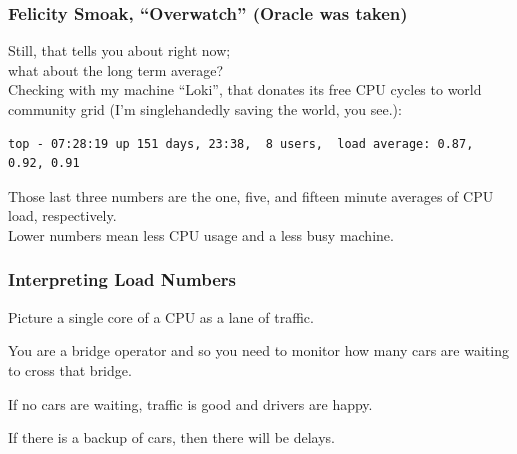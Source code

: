 \begin{frame}[fragile]
\frametitle{Felicity Smoak, ``Overwatch'' (Oracle was taken)}

\large
\begin{changemargin}{1cm}
Still, that tells you about right now; \\
what about the long term average? \\[1em]

Checking with my machine ``Loki'', that donates its free CPU cycles to world community grid (I'm singlehandedly saving the world, you see.):\\[1em]

{\scriptsize
\begin{verbatim}
top - 07:28:19 up 151 days, 23:38,  8 users,  load average: 0.87, 0.92, 0.91
\end{verbatim}
}

Those last three numbers are the one, five, and fifteen minute averages of CPU load, respectively. \\[1em]

Lower numbers mean less CPU usage and a less busy machine. 
\end{changemargin}

\end{frame}




\begin{frame}
\frametitle{Interpreting Load Numbers}

\large
\begin{changemargin}{1cm}
Picture a single core of a CPU as a lane of traffic. 

You are a bridge operator and so you need to monitor how many cars are waiting to cross that bridge. 

If no cars are waiting, traffic is good and drivers are happy. 

If there is a backup of cars, then there will be delays.
\end{changemargin}

\end{frame}



